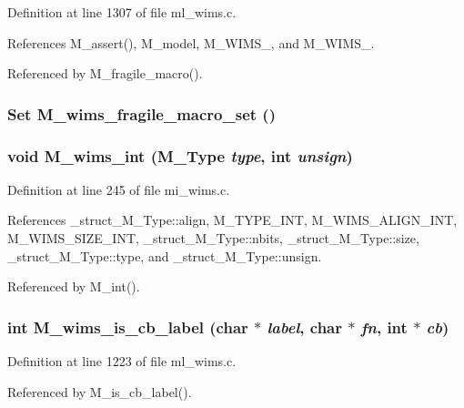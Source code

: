 Definition at line 1307 of file ml\_\-wims.c.

References M\_\-assert(), M\_\-model, M\_\-WIMS\_, and M\_\-WIMS\_.

Referenced by M\_\-fragile\_\-macro().
\subsubsection{\setlength{\rightskip}{0pt plus 5cm}\bf{Set} M\_\-wims\_\-fragile\_\-macro\_\-set ()}\label{m__wims_8h_33e05f0cfa736aec4e1e8082fcbfe5e5}


\subsubsection{\setlength{\rightskip}{0pt plus 5cm}void M\_\-wims\_\-int (\bf{M\_\-Type} {\em type}, int {\em unsign})}\label{m__wims_8h_ee6a0cec79c141565391d7f53e9719ab}




Definition at line 245 of file mi\_\-wims.c.

References \_\-struct\_\-M\_\-Type::align, M\_\-TYPE\_\-INT, M\_\-WIMS\_\-ALIGN\_\-INT, M\_\-WIMS\_\-SIZE\_\-INT, \_\-struct\_\-M\_\-Type::nbits, \_\-struct\_\-M\_\-Type::size, \_\-struct\_\-M\_\-Type::type, and \_\-struct\_\-M\_\-Type::unsign.

Referenced by M\_\-int().
\subsubsection{\setlength{\rightskip}{0pt plus 5cm}int M\_\-wims\_\-is\_\-cb\_\-label (char $\ast$ {\em label}, char $\ast$ {\em fn}, int $\ast$ {\em cb})}\label{m__wims_8h_0da47fd5c010bd6a99c9ff439c9f52e7}




Definition at line 1223 of file ml\_\-wims.c.

Referenced by M\_\-is\_\-cb\_\-label().
